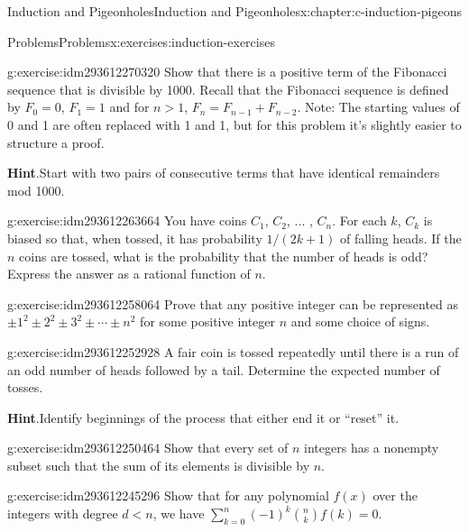 \documentclass[twoside,10pt,]{book}
\newcommand{\blocktitlefont}{\relax}
\numberwithin{equation}{section}
\newcommand{\lt}{<}
\begin{document}
\begin{chapterptx}{Induction and Pigeonholes}{}{Induction and Pigeonholes}{}{}{x:chapter:c-induction-pigeons}
\begin{exercises-section}{Problems}{}{Problems}{}{}{x:exercises:induction-exercises}
\begin{divisionexercise}{9}{}{}{g:exercise:idm293612270320}%
Show that there is a positive term of the Fibonacci sequence that is divisible by 1000. Recall that the Fibonacci sequence is defined by \(F_0=0\), \(F_1= 1\) and for \(n>1\), \(F_n= F_{n-1}+F_{n-2}\). Note: The starting values of 0 and 1 are often replaced with 1 and 1, but for this problem it's slightly easier to structure a proof.%
\par\smallskip%
\noindent\textbf{\blocktitlefont Hint}.\label{g:hint:idm293612264048}{}\hypertarget{g:hint:idm293612264048}{}\quad{}Start with two pairs of consecutive terms that have identical remainders mod 1000.%
\end{divisionexercise}%
\begin{divisionexercise}{10}{}{}{g:exercise:idm293612263664}%
You have coins \(C_1\), \(C_2\), ... , \(C_n\). For each \(k\), \(C_k\) is biased so that, when tossed, it has probability \(1/(2k + 1)\) of falling heads. If the \(n\) coins are tossed, what is the probability that the number of heads is odd? Express the answer as a rational function of \(n\).%
\end{divisionexercise}%
\begin{divisionexercise}{11}{}{}{g:exercise:idm293612258064}%
Prove that any positive integer can be represented as \(\pm 1^2\pm 2^2\pm 3^2\pm \cdots \pm n^2\) for some positive integer \(n\) and some choice of signs.%
\end{divisionexercise}%
\begin{divisionexercise}{12}{}{}{g:exercise:idm293612252928}%
A fair coin is tossed repeatedly until there is a run of an odd number of heads followed by a tail. Determine the expected number of tosses.%
\par\smallskip%
\noindent\textbf{\blocktitlefont Hint}.\label{g:hint:idm293612251600}{}\hypertarget{g:hint:idm293612251600}{}\quad{}Identify beginnings of the process that either end it or ``reset'' it.%
\end{divisionexercise}%
\begin{divisionexercise}{13}{}{}{g:exercise:idm293612250464}%
Show that every set of \(n\) integers has a nonempty subset such that the sum of its elements is divisible by \(n\).%
\end{divisionexercise}%
\begin{divisionexercise}{14}{}{}{g:exercise:idm293612245296}%
Show that for any polynomial \(f(x)\) over the integers with degree \(d\lt n\), we have \(\sum_{k=0}^{n} (-1)^k \binom{n}{k} f(k) = 0\).%

\end{divisionexercise}
\end{exercises-section}
\end{chapterptx}
\end{document}

